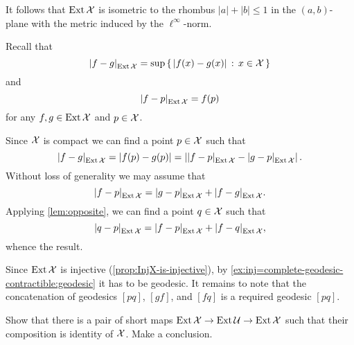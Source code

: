 It follows that $\mathop{\rm Ext}\nolimits\mathcal{X}$ is isometric to the rhombus $|a|+|b|\le 1$ in the $(a,b)$-plane with the metric induced by the $\ell^\infty$-norm.





Recall that 
\[\dist{f}{g}{\Inj\spc{X}}=\sup\set{|f(x)-g(x)|}{x\in\spc{X}}\]
and 
\[\dist{f}{p}{\Inj\spc{X}}=f(p)\]
for any $f,g\in \mathop{\rm Ext}\nolimits\mathcal{X}$ and $p\in \mathcal{X}$.

Since $\mathcal{X}$ is compact we can find a point $p\in\mathcal{X}$ such that 
\[\dist{f}{g}{\Inj\spc{X}}=|f(p)-g(p)|=\left|\dist{f}{p}{\Inj\spc{X}}-\dist{g}{p}{\Inj\spc{X}}\right|.\]
Without loss of generality we may assume that 
\[\dist{f}{p}{\Inj\spc{X}}
=
\dist{g}{p}{\Inj\spc{X}}
+
\dist{f}{g}{\Inj\spc{X}}.\]
Applying \ref{lem:opposite}, we can find a point $q\in\mathcal{X}$ such that 
\[\dist{q}{p}{\Inj\spc{X}}
=
\dist{f}{p}{\Inj\spc{X}}
+
\dist{f}{q}{\Inj\spc{X}},\]
whence the result.

Since $\mathop{\rm Ext}\nolimits\mathcal{X}$ is injective (\ref{prop:InjX-is-injective}), by \ref{ex:inj=complete-geodesic-contractible:geodesic} it has to be geodesic. It remains to note that the concatenation of geodesics $[pq]$, $[gf]$, and $[fq]$ is a required geodesic $[pq]$.

Show that there is a pair of short maps 
$\mathop{\rm Ext}\nolimits\mathcal{X}\to\mathop{\rm Ext}\nolimits\mathcal{U}\to\mathop{\rm Ext}\nolimits\mathcal{X}$ 
such that their composition is identity of $\mathcal{X}$.
Make a conclusion.

